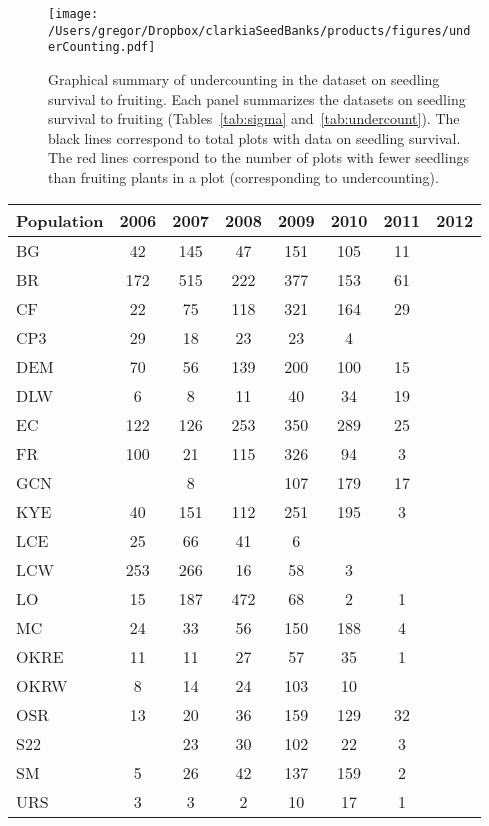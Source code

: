 \documentclass[12pt, oneside, titlepage]{article}   	%
\begin{document}
  \begin{figure}[h]
   \centering
       \texttt{[image: /Users/gregor/Dropbox/clarkiaSeedBanks/products/figures/underCounting.pdf]}  
    \caption{ Graphical summary of undercounting in the dataset on seedling survival to fruiting. Each panel summarizes the datasets on seedling survival to fruiting (Tables~\ref{tab:sigma} and~\ref{tab:undercount}). The black lines correspond to total plots with data on seedling survival. The red lines correspond to the number of plots with fewer seedlings than fruiting plants in a plot (corresponding to undercounting). }
 \label{fig:obs_pred}
\end{figure}
 
 
  \newpage
  
 \label{tab:sigma} 
\begin{table}[ht]
\centering
\begin{tabular}{lccccccc}
  \hline
Population & 2006 & 2007 & 2008 & 2009 & 2010 & 2011 & 2012 \\ 
  \hline
BG &  42 & 145 &  47 & 151 & 105 &  11 \\ 
  BR & 172 & 515 & 222 & 377 & 153 &  61 \\ 
  CF &  22 &  75 & 118 & 321 & 164 &  29 \\ 
  CP3 &  29 &  18 &  23 &  23 &   4 &  \\ 
  DEM &  70 &  56 & 139 & 200 & 100 &  15 \\ 
  DLW &   6 &   8 &  11 &  40 &  34 &  19 \\ 
  EC & 122 & 126 & 253 & 350 & 289 &  25 \\ 
  FR & 100 &  21 & 115 & 326 &  94 &   3 \\ 
  GCN &  &   8 &  & 107 & 179 &  17 \\ 
  KYE &  40 & 151 & 112 & 251 & 195 &   3 \\ 
  LCE &  25 &  66 &  41 &   6 &  &  \\ 
  LCW & 253 & 266 &  16 &  58 &   3 &  \\ 
  LO &  15 & 187 & 472 &  68 &   2 &   1 \\ 
  MC &  24 &  33 &  56 & 150 & 188 &   4 \\ 
  OKRE &  11 &  11 &  27 &  57 &  35 &   1 \\ 
  OKRW &   8 &  14 &  24 & 103 &  10 &  \\ 
  OSR &  13 &  20 &  36 & 159 & 129 &  32 \\ 
  S22 &  &  23 &  30 & 102 &  22 &   3 \\ 
  SM &   5 &  26 &  42 & 137 & 159 &   2 \\ 
  URS &   3 &   3 &   2 &  10 &  17 &   1 \\ 
   \hline
\end{tabular}
\end{table}
\end{document}
